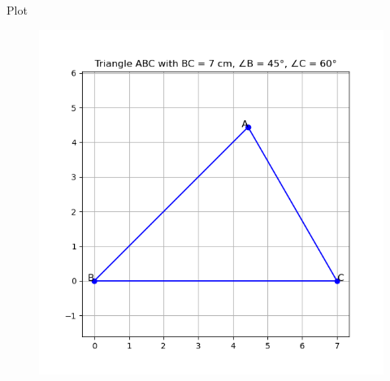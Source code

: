 \documentclass{beamer}
\begin{document}
\begin{frame}{Plot}
    \begin{figure}
        \centering
        \includegraphics[width=0.58\linewidth]{./figs/Figure_1.png}
        \caption{}
        \label{fig:fig1}
    \end{figure}
\end{frame}
\end{document}
